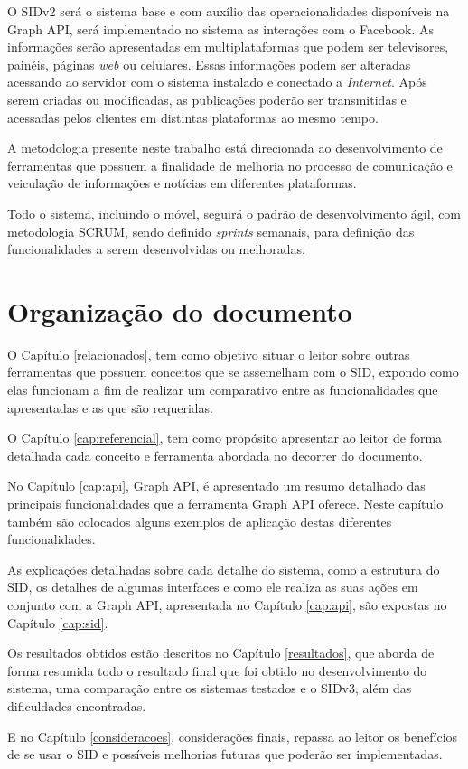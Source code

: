 O SIDv2 será o sistema base e com auxílio das operacionalidades disponíveis na Graph API, será implementado no sistema as interações com o Facebook. As informações serão apresentadas em multiplataformas que podem ser televisores, painéis, páginas \textit{web} ou celulares. Essas informações podem ser alteradas acessando ao servidor com o sistema instalado e conectado a \textit{Internet}. Após serem criadas ou modificadas, as publicações poderão ser transmitidas e acessadas pelos clientes em distintas plataformas ao mesmo tempo.

A metodologia presente neste trabalho está direcionada ao desenvolvimento de ferramentas que possuem a finalidade de melhoria no processo de comunicação e veiculação de informações e notícias em diferentes plataformas. 

Todo o sistema, incluindo o móvel, seguirá o padrão de desenvolvimento ágil, com metodologia SCRUM, sendo definido \textit{sprints} semanais, para definição das funcionalidades a serem desenvolvidas ou melhoradas. 

\section{Organização do documento}
O Capítulo \ref{relacionados}, tem como objetivo situar o leitor sobre outras ferramentas que possuem conceitos que se assemelham com o SID, expondo como elas funcionam a fim de realizar um comparativo entre as funcionalidades que apresentadas e as que são requeridas.

O Capítulo \ref{cap:referencial}, tem como propósito apresentar ao leitor de forma detalhada cada conceito e ferramenta abordada no decorrer do documento.

No Capítulo \ref{cap:api}, Graph API, é apresentado um resumo detalhado das principais funcionalidades que a ferramenta Graph API oferece. Neste capítulo também são colocados alguns exemplos de aplicação destas diferentes funcionalidades.

As explicações detalhadas sobre cada detalhe do sistema, como a estrutura do SID, os detalhes de algumas interfaces e como ele realiza as suas ações em conjunto com a Graph API, apresentada no Capítulo \ref{cap:api}, são expostas no Capítulo \ref{cap:sid}.

Os resultados obtidos estão descritos no Capítulo \ref{resultados}, que aborda de forma resumida todo o resultado final que foi obtido no desenvolvimento do sistema, uma comparação entre os sistemas testados e o SIDv3, além das dificuldades encontradas.

E no Capítulo \ref{consideracoes}, considerações finais, repassa ao leitor os benefícios de se usar o SID e possíveis melhorias futuras que poderão ser implementadas.